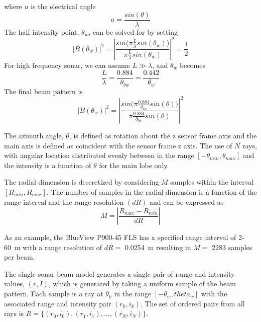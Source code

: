 \documentclass[11pt]{article}
\begin{document}
where $u$ is the electrical angle
\begin{equation}
    u = \frac{sin(\theta)}{\lambda}
\end{equation}
The half intensity point, $\theta_w$, can be solved for by setting
\begin{equation}
    |B(\theta_w)|^2 = \left|\frac{sin\big(\pi\frac{L}{\lambda}sin(\theta_w)\big)}{\pi\frac{L}{\lambda}sin(\theta_w)}\right|^2 = \frac{1}{2}    
\end{equation}
For high frequency sonar, we can assume $L \gg \lambda$, and $\theta_w$ becomes 
\begin{equation}
    \frac{L}{\lambda} = \frac{0.884}{\theta_{bw}} = \frac{0.442}{\theta_w}
\end{equation}
The final beam pattern is 
\begin{equation}
    |B(\theta_w)|^2 = \left|\frac{sin\big(\pi\frac{0.884}{\theta_{bw}}sin(\theta)\big)}{\pi \frac{0.884}{\theta_{bw}}sin(\theta)}\right|^2
\end{equation}

The azimuth angle, $\theta$, is defined as rotation about the z sensor frame axis and the main axis is defined as coincident with the sensor frame z axis. The use of $N$ rays, with angular location distributed evenly between in the range $[-\theta_{min}, \theta_{max}]$ and the intensity is a function of $\theta$ for the main lobe only.

The radial dimension is descretized by considering $M$ samples within the interval $[R_{min}, R_{max}]$. The number of samples in the radial dimension is a function of the range interval and the range resolution $(dR)$ and can be expressed as 
\begin{equation}
    M=\left| \frac{R_{max} - R_{min}}{dR} \right|
\end{equation}

As an example, the BlueView P900-45 FLS has a specified range interval of 2-\SI{60}{\meter} with a range resolution of $dR=$ \SI{0.0254}{\meter} resulting in $M=$ 2283 samples per beam. 

The single sonar beam model generates a single pair of range and intensity values, $(r,I)$, which is generated by taking a uniform sample of the beam pattern. Each sample is a ray at $\theta_k$ in the range $[-\theta_w, theta_w]$ with the associated range and intensity pair $(r_k, i_k)$. The set of ordered pairs from all rays is $R=\{(r_0,i_0),(r_1,i_1),...,(r_N,i_N)\}$.
\end{document}

